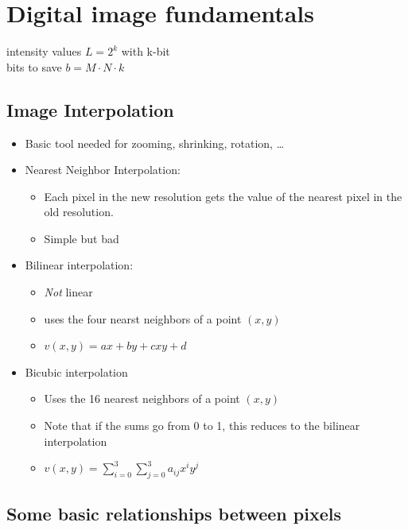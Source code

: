 \section{Digital image fundamentals }
  \begin{center}
    intensity values $L = 2^k$  with k-bit\\
    bits to save $b = M \cdot N \cdot k$
  \end{center}
\subsection{Image Interpolation }
\begin{itemize}
  \item Basic tool needed for zooming, shrinking, rotation, \ldots
  \item Nearest Neighbor Interpolation:
	  \begin{itemize}
		  \item Each pixel in the new resolution gets the value of the nearest pixel in the old resolution.
		  \item Simple but bad
	\end{itemize}
  \item Bilinear interpolation:
  	\begin{itemize}
		\item \emph{Not} linear
  	  \item uses the four nearst neighbors of a point $(x,y)$
  	  \item $v(x,y) = ax + by + cxy + d$
  	\end{itemize}
  \item Bicubic interpolation
	\begin{itemize}
  	  \item Uses the 16 nearest neighbors of a point $(x,y)$
  	  \item Note that if the sums go from 0 to 1, this reduces to the bilinear interpolation
  	  \item $v(x,y) = \sum\limits_{i=0}^3\sum\limits_{j=0}^3 a_{ij}x^iy^j$
  	\end{itemize}
\end{itemize}


\subsection{Some basic relationships between pixels }
